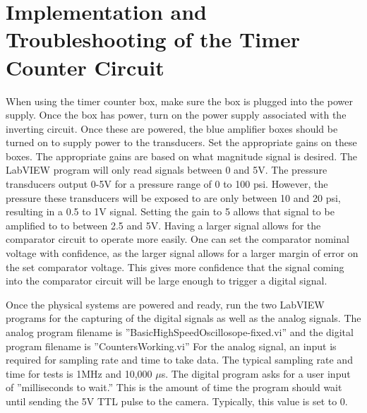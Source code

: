
\chapter{Implementation and Troubleshooting of the Timer Counter Circuit} %

\label{Appendix 1} %

When using the timer counter box, make sure the box is plugged into the power supply. Once the box has power, turn on the power supply associated with the inverting circuit. Once these are powered, the blue amplifier boxes should be turned on to supply power to the transducers. Set the appropriate gains on these boxes. The appropriate gains are based on what magnitude signal is desired. The LabVIEW program will only read signals between 0 and 5V. The pressure transducers output 0-5V for a pressure range of 0 to 100 psi. However, the pressure these transducers will be exposed to are only between 10 and 20 psi, resulting in a 0.5 to 1V signal. Setting the gain to 5 allows that signal to be amplified to to between 2.5 and 5V. Having a larger signal allows for the comparator circuit to operate more easily. One can set the comparator nominal voltage with confidence, as the larger signal allows for a larger margin of error on the set comparator voltage. This gives more confidence that the signal coming into the comparator circuit will be large enough to trigger a digital signal. 

Once the physical systems are powered and ready, run the two LabVIEW programs for the capturing of the digital signals as well as the analog signals. The analog program filename is ''BasicHighSpeedOscillosope-fixed.vi'' and the digital program filename is ''CountersWorking.vi'' For the analog signal, an input is required for sampling rate and time to take data. The typical sampling rate and time for tests is 1MHz and 10,000 $\mu$s. The digital program asks for a user input of ''milliseconds to wait.'' This is the amount of time the program should wait until sending the 5V TTL pulse to the camera. Typically, this value is set to 0. 

